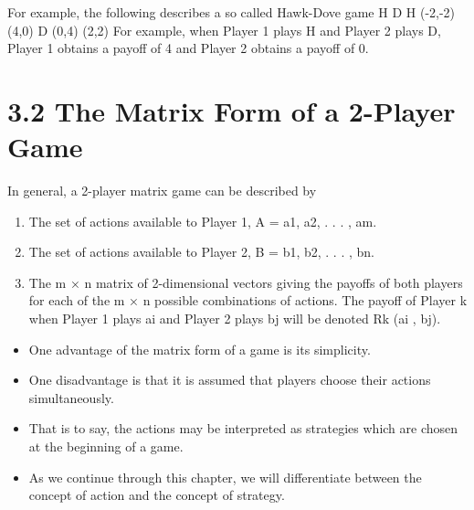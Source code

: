 \documentclass[]{report}
\begin{document}

For example, the following describes a so called Hawk-Dove game
H D
H (-2,-2) (4,0)
D (0,4) (2,2)
For example, when Player 1 plays H and Player 2 plays D, Player 1
obtains a payoff of 4 and Player 2 obtains a payoff of 0.

\section{3.2 The Matrix Form of a 2-Player Game}
In general, a 2-player matrix game can be described by
\begin{enumerate}
	\item The set of actions available to Player 1,
	A = {a1, a2, . . . , am}.
\item The set of actions available to Player 2,
	B = {b1, b2, . . . , bn}.
\item The m × n matrix of 2-dimensional vectors giving the
	payoffs of both players for each of the m × n possible
	combinations of actions. The payoff of Player k when
	Player 1 plays ai and Player 2 plays bj will be
	denoted Rk (ai
	, bj).
	
\end{enumerate}

\begin{itemize}
	\item One advantage of the matrix form of a game is its simplicity.
	\item	One disadvantage is that it is assumed that players choose their
	actions simultaneously.
	\item That is to say, the actions may be
	interpreted as strategies which are chosen at the beginning of a
	game.
	\item	As we continue through this chapter, we will differentiate between
	the concept of action and the concept of strategy.
	
\end{itemize}

\end{document}
